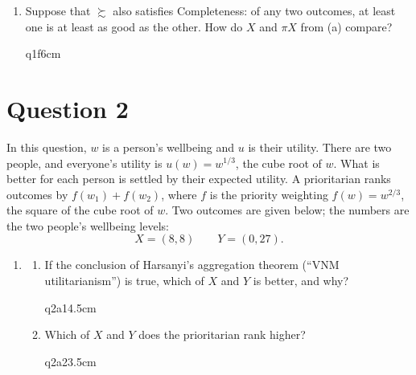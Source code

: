 \begin{Form}
\begin{enumerate}
  \item Suppose that $\succsim$ also satisfies Completeness: of any two outcomes, at least one is at least as good as the other. How do $X$ and $\pi X$ from (a) compare?
\begin{answer}{q1f}{6cm}
\end{answer}

\end{enumerate}

\section*{Question 2}

In this question, $w$ is a person's wellbeing and $u$ is their utility. There are two
people, and everyone's utility is $u(w) = w^{1/3}$, the cube root of $w$. What is better
for each person is settled by their expected utility. A prioritarian
ranks outcomes by $f(w_1) + f(w_2)$, where $f$ is the priority weighting $f(w) = w^{2/3}$,
the square of the cube root of $w$. Two outcomes are given below; the numbers are the two people's wellbeing levels:
\[
X = (8, 8) \qquad Y = (0, 27).
\]

\begin{enumerate}
  \item
  \begin{enumerate}
    \item If the conclusion of Harsanyi's aggregation theorem (``VNM utilitarianism'') is true, which of $X$ and $Y$ is better, and why?
\begin{answer}{q2a1}{4.5cm}
\end{answer}

    \item Which of $X$ and $Y$ does the prioritarian rank higher?
\begin{answer}{q2a2}{3.5cm}
\end{answer}

  \end{enumerate}


\end{enumerate}
\end{Form}

